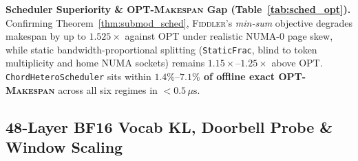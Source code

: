 \documentclass[10pt,twocolumn]{article}
\theoremstyle{definition}
\begin{document}
\vspace{2pt}
\noindent\textbf{Scheduler Superiority \& \textsc{OPT-Makespan} Gap (Table~\ref{tab:sched_opt}).}
Confirming Theorem~\ref{thm:submod_sched}, \textsc{Fiddler}'s \emph{min-sum} objective degrades makespan by up to \textbf{$1.525\times$} against \textsc{OPT} under realistic NUMA-0 page skew, while static bandwidth-proportional splitting (\texttt{StaticFrac}, blind to token multiplicity and home NUMA sockets) remains $1.15\times\text{--}1.25\times$ above \textsc{OPT}. \texttt{ChordHeteroScheduler} sits within \textbf{$1.4\%\text{--}7.1\%$ of offline exact \textsc{OPT-Makespan}} across all six regimes in $<\!0.5\,\mu\text{s}$.

\subsection{48-Layer BF16 Vocab KL, Doorbell Probe \& Window Scaling}
\label{sec:eval_bf16_kl}
\end{document}
